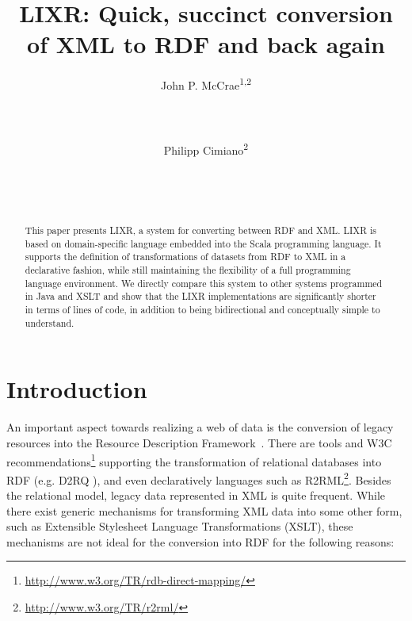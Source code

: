 \documentclass{acm_proc_article-sp}
\begin{document}
\title{LIXR: Quick, succinct conversion of XML to RDF and back again}


\author{
\alignauthor
John P. McCrae\textsuperscript{1,2}\\
\\
       \\
       \\
\alignauthor
Philipp Cimiano\textsuperscript{2}\\
\\
       \\
       \\
}

\maketitle
\begin{abstract}
This paper presents LIXR, a system for converting between RDF and XML. LIXR is based on   domain-specific language embedded into the Scala programming language.
It supports the definition of transformations of 
datasets from RDF to XML in a declarative fashion, while still maintaining the flexibility of a full
programming language environment. We directly compare this system to other systems
programmed in Java and XSLT and show that the LIXR implementations are significantly
shorter in terms of lines of code, in addition to being bidirectional and conceptually simple to understand.

\end{abstract}




\section{Introduction}

An important aspect towards realizing a web of data is the conversion of legacy resources into the 
Resource Description Framework~\cite[RDF]{cyganiak2014rdf}. There are tools and
W3C recommendations\footnote{\url{http://www.w3.org/TR/rdb-direct-mapping/}}
supporting the transformation of relational databases into RDF (e.g. D2RQ
\cite{bizer2004d2rq}), and even declaratively languages such as
R2RML\footnote{\url{http://www.w3.org/TR/r2rml/}}. Besides the relational model,
legacy data represented in XML is quite frequent. While there exist generic
mechanisms for transforming XML data into some other form, such as Extensible
Stylesheet Language Transformations (XSLT), these mechanisms are not ideal for
the conversion into RDF for the following reasons: 
\end{document}
